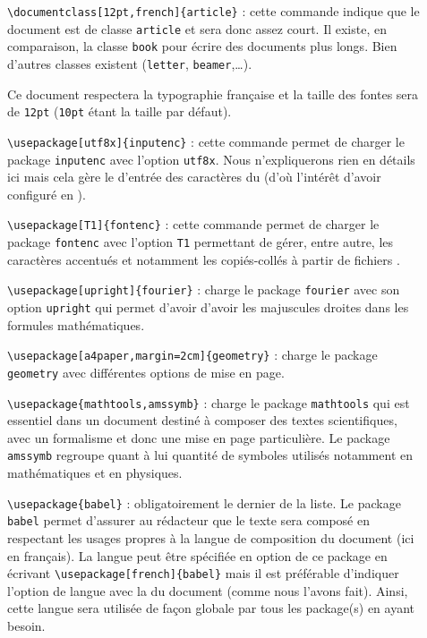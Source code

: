 \begin{description}
    \item[] \verb!\documentclass[12pt,french]{article}! : cette commande indique que le document est de classe \verb!article! et sera donc assez court. Il existe, en comparaison, la classe \verb!book! pour écrire des documents plus longs. Bien d'autres classes existent (\verb!letter!, \verb!beamer!,\dots).\par
        Ce document respectera la typographie française et la taille des fontes sera de \verb!12pt! (\verb!10pt! étant la taille par défaut).
    \item[] \verb!\usepackage[utf8x]{inputenc}! : cette commande permet de charger le package \verb!inputenc! avec l'option \verb!utf8x!. Nous n'expliquerons rien en détails ici mais cela gère le  d'entrée des caractères du  (d'où l'intérêt d'avoir configuré  en ).
    \item[] \verb!\usepackage[T1]{fontenc}! : cette commande permet de charger le package \verb!fontenc! avec l'option \verb!T1! permettant de gérer, entre autre, les caractères accentués et notamment les \og copiés-collés \fg{} à partir de fichiers .
    \item[] \verb!\usepackage[upright]{fourier}! : charge le package \verb!fourier! avec son option \verb!upright! qui permet d'avoir d'avoir les majuscules droites dans les formules mathématiques.
    \item[] \verb!\usepackage[a4paper,margin=2cm]{geometry}! : charge le package \verb!geometry! avec différentes options de mise en page.
    \item[] \verb!\usepackage{mathtools,amssymb}! : charge le package \verb!mathtools! qui est essentiel dans un document destiné à composer des textes scientifiques, avec un formalisme et donc une mise en page particulière. Le package \verb!amssymb! regroupe quant à lui quantité de symboles utilisés notamment en mathématiques et en physiques.
    \item[] \verb!\usepackage{babel}! : obligatoirement le dernier de la liste. Le package \verb!babel! permet d'assurer au rédacteur que le texte sera composé en respectant les usages propres à la langue de composition du document (ici en français). La langue peut être spécifiée en option de ce package en écrivant \verb!\usepackage[french]{babel}! mais il est préférable d'indiquer l'option de langue avec la  du document (comme nous l'avons fait). Ainsi, cette langue sera utilisée de façon globale par tous les package(s) en ayant besoin.
\end{description}

